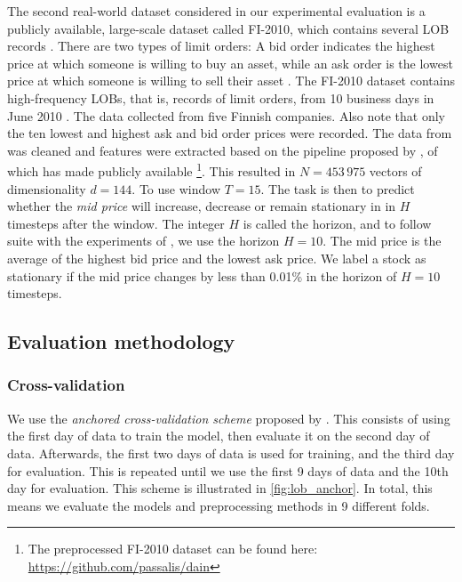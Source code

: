 \documentclass{statsmsc}
\begin{document}
{%
The second real-world dataset considered in our experimental evaluation is a publicly available,
large-scale dataset called FI-2010, which contains several \ac{LOB} records
\citep{lob-data}.
There are two types of limit orders: A bid order indicates the highest price at
which someone is willing to buy an asset, while an ask order is the lowest
price at which someone is willing to sell their asset \citep{gould2013limit}.
The FI-2010 dataset contains high-frequency \acp{LOB}, that is,
records of limit orders, from 10 business days in June 2010 \citep{lob-data}.
The data collected from five Finnish companies. Also
note that only the ten lowest and highest ask and bid order prices were recorded.
The data from \cite{lob-data} was cleaned and features were extracted based on the pipeline
proposed by \cite{lob_preprocess}, of which \cite{dain} has made publicly available%
\footnote{The preprocessed FI-2010 dataset can be found here: \url{https://github.com/passalis/dain}}.
This resulted in $N=453\,975$ vectors of dimensionality $d=144$. To
use window $T=15$.
The task is then to predict whether the \textit{mid price} will increase, decrease or remain
stationary in in $H$ timesteps after the window. The integer $H$ is called the
horizon, and to follow suite with the experiments of \cite{dain}, we use the horizon $H=10$.
The mid price is the average of  the highest bid price and the lowest ask price. We label a stock
as stationary if the mid price changes by less than 0.01\% in the horizon of $H=10$ timesteps.



\subsection{Evaluation methodology}%
\label{sec:lob_meth}

\subsubsection{Cross-validation}%
\label{ssub:Cross-validation}

We use the \textit{anchored cross-validation scheme}  proposed by \cite{lob-data}.
This consists of using the first day of data to train the model, then evaluate it on the second
day of data. Afterwards, the first two days of data is used for training, and the third day
for evaluation. This is repeated until we use the first 9 days of data and the 10th day for evaluation. This scheme is illustrated in \cref{fig:lob_anchor}.
In total, this means we evaluate the models and preprocessing methods in 9 different folds.

}
\end{document}
